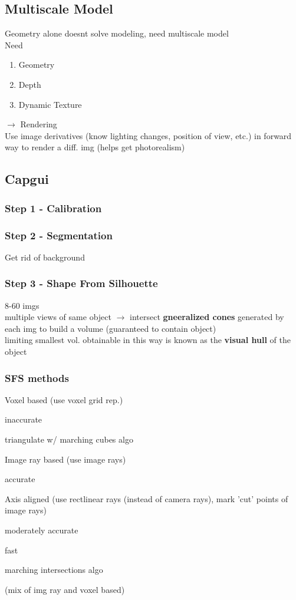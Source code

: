 \documentclass{article}
\begin{document}
\subsection{Multiscale Model}
Geometry alone doesnt solve modeling, need multiscale model
\\
Need
\begin{enumerate}
  \item Geometry
  \item Depth
  \item Dynamic Texture
\end{enumerate}
$\to$ Rendering
\\
Use image derivatives (know lighting changes, position of view, etc.) in forward way to render a diff. img (helps get photorealism)


\subsection{Capgui}
\subsubsection*{Step 1 - Calibration}
\subsubsection*{Step 2 - Segmentation}
Get rid of background
\subsubsection*{Step 3 - Shape From Silhouette}
8-60 imgs
\\
multiple views of same object $\to$ intersect \textbf{gneeralized cones} generated by each img
to build a volume (guaranteed to contain object)
\\
limiting smallest vol. obtainable in this way is known as the \textbf{visual hull} of the object


\subsubsection{SFS methods}
Voxel based (use voxel grid rep.)
\begin{list}{}{}
  \item inaccurate
  \item triangulate w/ marching cubes algo
\end{list}
Image ray based (use image rays)
\begin{list}{}{}
  \item accurate
\end{list}
Axis aligned (use rectlinear rays (instead of camera rays), mark 'cut' points of 
image rays)
\begin{list}{}{}
  \item moderately accurate
  \item fast
  \item marching intersections algo
  \item (mix of img ray and voxel based)
\end{list}
\end{document}
